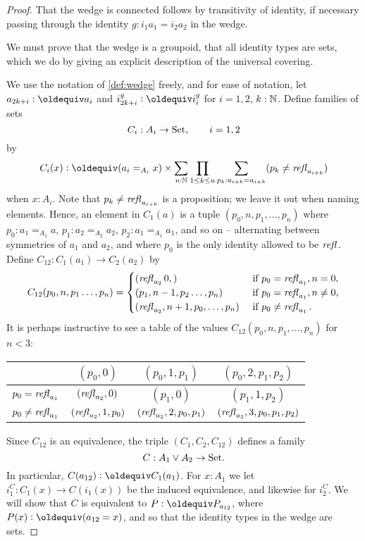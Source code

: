 \begin{proof}
That the wedge is connected follows by transitivity of identity, if necessary passing through the identity $g:i_1a_1=i_2a_2$ in the wedge.

We must prove that the wedge is a groupoid, \ie that all identity types are sets, which we do by giving an explicit description of the universal covering. 

 We use the notation of \cref{def:wedge} freely, and for ease of notation, let $a_{2k+i}\defequi a_i$ and $i_{2k+i}^g\defequi i_i^g$ for $i=1,2$, $k:\mathbb{N}$.  %
Define families of sets
$$C_i:A_i\to\mathord{\mathrm{Set}},\qquad i=1,2$$
by 
$$C_i(x)\defequi(a_i=_{A_i}x)\times\sum_{n:\NN}\prod_{1\leq k\leq n}\sum_{p_k:a_{i+k}=%
  a_{i+k}}(p_k\neq\refl {a_{i+k}})$$
when $x:A_i$.  Note that $p_k\neq\mathop{{\it refl}_{a_{i+k}}}$  is a proposition; we leave it out when naming elements. Hence, an element in $C_1(a)$ is a tuple
$(p_0,n,p_1,\dots,p_n)$ where $p_0:a_1=_{A_1}a$, $p_1:a_2=_{A_2}a_2$, $p_2:a_1=_{A_1}a_1$, and so on -- alternating between symmetries of $a_1$ and $a_2$, and where $p_0$ is the only identity allowed to be $\mathop{{\it refl}_{}}$. Define $C_{12}:C_1(a_1)\to C_2(a_2)$ by
$$C_{12}(p_0,n,p_1\dots,p_n)=
\begin{cases}
  (\mathop{{\it refl}_{a_2}}0,)&\text{ if }p_0=\mathop{{\it refl}_{a_1}}, n=0,\\
  (p_1,n-1,p_2\dots,p_n)& \text{ if }p_0=\mathop{{\it refl}_{a_1}},n\neq0,\\
  (\mathop{{\it refl}_{a_2}},n+1,p_0,\dots,p_n)& \text{ if }p_0\neq\mathop{{\it refl}_{a_1}}.
\end{cases}
$$
It is perhaps instructive to see a table of the values $C_{12}(p_0,n,p_1,\dots,p_n)$ for $n<3$:
\begin{center}
  \begin{tabular}{r|c cc}
    &$(p_0,0)$&$(p_0,1,p_1)$&$(p_0,2,p_1,p_2)$\\
    \hline
    $p_0=\mathop{{\it refl}_{a_1}}$&$(\mathop{{\it refl}_{a_2}},0)$&$(p_1,0)$&$(p_1,1,p_2)$\\
    $p_0\neq\mathop{{\it refl}_{a_1}}$&$(\mathop{{\it refl}_{a_2}},1,p_0)$&$(\mathop{{\it refl}_{a_2}},2,p_0,p_1)$&$(\mathop{{\it refl}_{a_2}},3,p_0,p_1,p_2)$
  \end{tabular}
\end{center}
Since $C_{12}$ is an equivalence, the triple $(C_1,C_2,C_{12})$ defines a family
$$C:A_1\vee A_2\to\mathord{\mathrm{Set}}.$$
In particular, $C(a_{12})\defequi C_1(a_1)$.
For $x:A_1$ we let $i^C_1:C_1(x)\to C(i_1(x))$ be the induced equivalence, and likewise for $i^C_2$.
We will show that $C$ is equivalent to $P\defequi P_{a_{12}}$, where $P(x)\defequi(a_{12}=x)$, and so that the identity types in the wedge are sets.


\end{proof}

